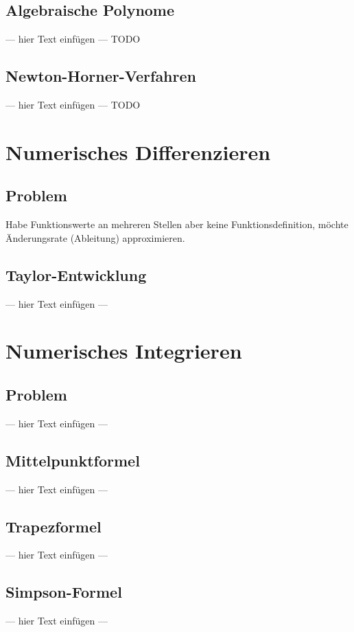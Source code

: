 \documentclass[a4paper, 12pt]{article}
\begin{document}
\subsection{Algebraische Polynome}
--- hier Text einfügen --- TODO


\subsection{Newton-Horner-Verfahren}
--- hier Text einfügen --- TODO



\section{Numerisches Differenzieren}


\subsection{Problem}
Habe Funktionswerte an mehreren Stellen aber keine Funktionsdefinition, möchte Änderungsrate (Ableitung) approximieren.


\subsection{Taylor-Entwicklung}
--- hier Text einfügen ---



\section{Numerisches Integrieren}


\subsection{Problem}
--- hier Text einfügen ---


\subsection{Mittelpunktformel}
--- hier Text einfügen ---


\subsection{Trapezformel}
--- hier Text einfügen ---


\subsection{Simpson-Formel}
--- hier Text einfügen ---
\end{document}
